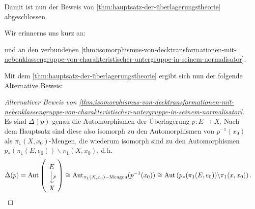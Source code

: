 Damit ist nun der Beweis von \autoref{thm:hauptsatz-der-überlagerungstheorie} abgeschlossen.

Wir erinnerns uns kurz an:

\LmDecktransformation*

\ThmDecktransformationNormalisator*

und an den verbundenen \autoref{thm:isomorphismus-von-decktransformationen-mit-nebenklassengruppe-von-charakteristischer-untergruppe-in-seinem-normalisator}.


Mit dem \autoref{thm:hauptsatz-der-überlagerungstheorie} ergibt sich nun der folgende Alternative Beweis:

\begin{proof}[Alternativer Beweis von \autoref{thm:isomorphismus-von-decktransformationen-mit-nebenklassengruppe-von-charakteristischer-untergruppe-in-seinem-normalisator}]
    
Es sind $\Delta(p)$ genau die Automorphismen der Überlagerung  $p\colon  E \to X$. Nach dem Hauptsatz sind diese also isomorph zu den Automorphismen von $p^{-1} (x_0)$ als $\pi_1(X,x_0)$-Mengen, die wiederum isomorph sind zu den Automorphismen $p_*(\pi_1(E,e_0)) \backslash \pi_1(X,x_0)$, d.h.
\[
    \Delta(p) = \Aut \left(
    \begin{tikzcd}
        E \ar{d}{p} \\ X
    \end{tikzcd}\right) 
    \cong \Aut_{\pi_1(X,x_0)-\text{Mengen}} (p^{-1} (x_0)) \cong \Aut \left( p_*(\pi_1(E,e_0)) \backslash \pi_1(x,x_0) \right) 
.\] 
\end{proof}

